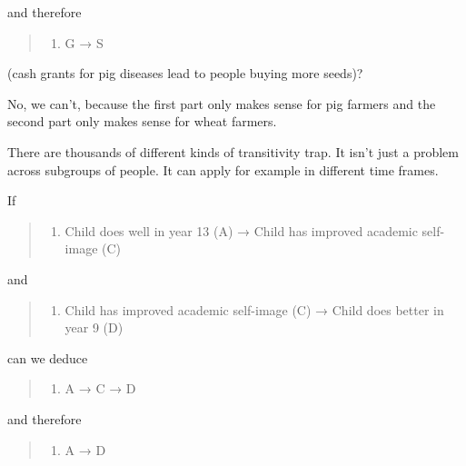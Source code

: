 \documentclass[
]{book}
\providecommand{\tightlist}{%
  \setlength{\itemsep}{0pt}\setlength{\parskip}{0pt}}
\begin{document}
and therefore

\begin{quote}
\begin{enumerate}
\def\labelenumi{\arabic{enumi})}
\setcounter{enumi}{3}
\tightlist
\item
  G → S
\end{enumerate}
\end{quote}

(cash grants for pig diseases lead to people buying more seeds)?

No, we can't, because the first part only makes sense for pig farmers and the second part only makes sense for wheat farmers.

There are thousands of different kinds of transitivity trap. It isn't just a problem across subgroups of people. It can apply for example in different time frames.

If

\begin{quote}
\begin{enumerate}
\def\labelenumi{\arabic{enumi})}
\tightlist
\item
  Child does well in year 13 (A) → Child has improved academic self-image (C)
\end{enumerate}
\end{quote}

and

\begin{quote}
\begin{enumerate}
\def\labelenumi{\arabic{enumi})}
\setcounter{enumi}{1}
\tightlist
\item
  Child has improved academic self-image (C) → Child does better in year 9 (D)
\end{enumerate}
\end{quote}

can we deduce

\begin{quote}
\begin{enumerate}
\def\labelenumi{\arabic{enumi})}
\setcounter{enumi}{2}
\tightlist
\item
  A → C → D
\end{enumerate}
\end{quote}

and therefore

\begin{quote}
\begin{enumerate}
\def\labelenumi{\arabic{enumi})}
\setcounter{enumi}{3}
\tightlist
\item
  A → D
\end{enumerate}
\end{quote}
\end{document}
